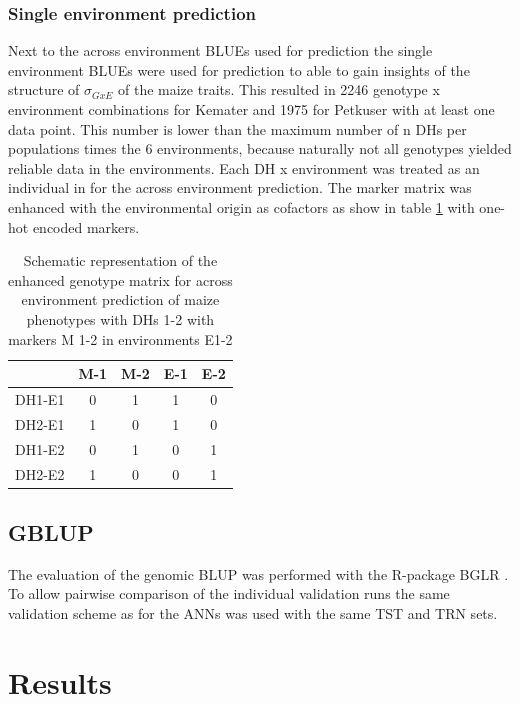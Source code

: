\subsubsection{Single environment prediction}
Next to the across environment BLUEs used for prediction the single environment BLUEs were
used for prediction to able to gain insights of the structure of $\sigma_{GxE}$ of the
maize traits. This resulted in 2246 genotype x environment combinations for Kemater and
1975 for Petkuser with at least one data point. This number is lower than the maximum
number of n DHs per populations times the 6 environments, because naturally not all
genotypes yielded reliable data in the environments. Each DH x environment was treated as
an individual in for the across environment prediction. The marker matrix was enhanced
with the environmental origin as cofactors as show in table \ref{tab:envmarker} with
one-hot encoded markers.

\onehalfspacing
\begin{table}[H]
 \centering
 \caption{Schematic representation of the enhanced genotype matrix for across environment prediction of maize phenotypes with DHs 1-2 with markers M 1-2 in environments E1-2}
 \label{tab:envmarker}
 \begin{tabular}{l|cccc}
  \toprule
      & M-1 & M-2 & E-1 & E-2 \\
  \midrule
  DH1-E1 & 0  & 1  & 1  & 0  \\
  DH2-E1 & 1  & 0  & 1  & 0  \\
  DH1-E2 & 0  & 1  & 0  & 1  \\
  DH2-E2 & 1  & 0  & 0  & 1  \\                      
  \bottomrule
 \end{tabular}
\end{table}
\doublespacing

\subsection{GBLUP}

The evaluation of the genomic BLUP was performed with the R-package BGLR \cite{BGLR}. To
allow pairwise comparison of the individual validation runs the same validation scheme as
for the ANNs was used with the same TST and TRN sets.

\section{Results} \label{res:gp}
